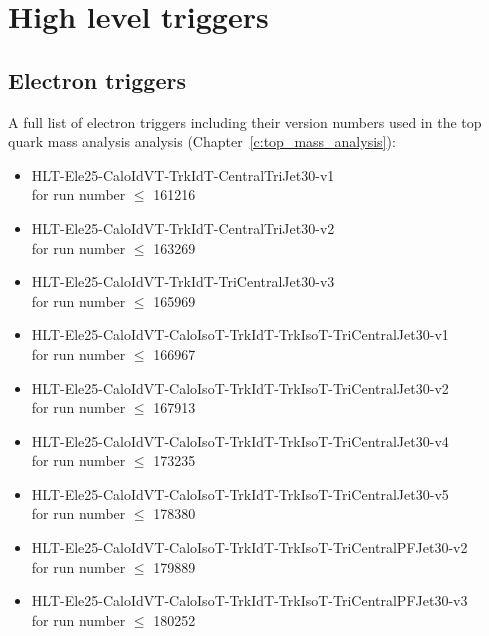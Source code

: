 
\chapter{High level triggers}
\label{a:full_trigger_list}
 
\section{Electron triggers}
\label{s:full_trigger_list_electron}
  
A full list of electron triggers including their version numbers used in the top quark mass analysis analysis
(Chapter~\ref{c:top_mass_analysis}):
\begin{itemize}
 \item HLT-Ele25-CaloIdVT-TrkIdT-CentralTriJet30-v1 \\for run number $\leq$ 161216
 \item HLT-Ele25-CaloIdVT-TrkIdT-CentralTriJet30-v2 \\for run number $\leq$ 163269
 \item HLT-Ele25-CaloIdVT-TrkIdT-TriCentralJet30-v3 \\for run number $\leq$ 165969
 \item HLT-Ele25-CaloIdVT-CaloIsoT-TrkIdT-TrkIsoT-TriCentralJet30-v1 \\for run number $\leq$ 166967
 \item HLT-Ele25-CaloIdVT-CaloIsoT-TrkIdT-TrkIsoT-TriCentralJet30-v2 \\for run number $\leq$ 167913
 \item HLT-Ele25-CaloIdVT-CaloIsoT-TrkIdT-TrkIsoT-TriCentralJet30-v4 \\for run number $\leq$ 173235
 \item HLT-Ele25-CaloIdVT-CaloIsoT-TrkIdT-TrkIsoT-TriCentralJet30-v5 \\for run number $\leq$ 178380
 \item \small{HLT-Ele25-CaloIdVT-CaloIsoT-TrkIdT-TrkIsoT-TriCentralPFJet30-v2 \\for run number $\leq$ 179889}
 \item HLT-Ele25-CaloIdVT-CaloIsoT-TrkIdT-TrkIsoT-TriCentralPFJet30-v3 \\for run number $\leq$ 180252
\end{itemize}


